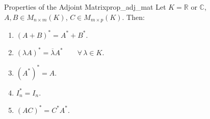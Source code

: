 \begin{proposition}{Properties of the Adjoint Matrix}{prop_adj_mat}
	Let $K=\mathbb{R}$ or $\mathbb{C}$, $A, B \in M_{n\times m}(K)$, $C \in M_{m \times p}(K)$. Then:
	\begin{enumerate}
		\item $(A + B)^* = A^* + B^*$.
		\item $(\lambda A)^* = \overline{\lambda }A^* \qquad \forall \, \lambda \in K$.
		\item $(A^*)^* = A$.
		\item $I_n^* = I_n$.
		\item $(AC)^* = C^* A^*$.
	\end{enumerate}
\end{proposition}